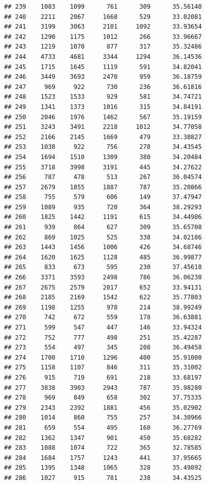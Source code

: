\documentclass[
]{article}
\begin{document}
\begin{verbatim}
## 239    1083    1099      761      309      35.56140
## 240    2211    2067     1668      529      33.02081
## 241    3199    3063     2101     1092      33.93654
## 242    1290    1175     1012      266      33.96667
## 243    1219    1070      877      317      35.32486
## 244    4733    4681     3344     1294      36.14536
## 245    1715    1645     1119      591      34.82041
## 246    3449    3693     2470      959      36.18759
## 247     969     922      730      236      36.61816
## 248    1523    1533      929      581      34.74721
## 249    1341    1373     1016      315      34.84191
## 250    2046    1976     1462      567      35.19159
## 251    3243    3491     2218     1012      34.77058
## 252    2166    2145     1669      479      33.38827
## 253    1038     922      756      278      34.43545
## 254    1694    1510     1309      380      34.20484
## 255    3718    3998     3191      445      34.27622
## 256     787     478      513      267      36.04574
## 257    2679    1855     1887      787      35.20866
## 258     755     579      606      149      37.47947
## 259    1089     935      720      364      38.29293
## 260    1825    1442     1191      615      34.44986
## 261     939     864      627      309      35.65708
## 262     869    1025      525      338      34.02186
## 263    1443    1456     1006      426      34.68746
## 264    1620    1625     1128      485      36.99877
## 265     833     673      595      230      37.45618
## 266    3371    3593     2498      786      36.06230
## 267    2675    2579     2017      652      33.94131
## 268    2185    2169     1542      622      35.77803
## 269    1198    1255      978      214      38.99249
## 270     742     672      559      178      36.63881
## 271     599     547      447      146      33.94324
## 272     752     777      498      251      35.42287
## 273     554     497      345      208      36.49458
## 274    1700    1710     1296      400      35.91000
## 275    1158    1107      846      311      35.31002
## 276     915     719      691      218      33.68197
## 277    3838    3903     2943      787      35.98280
## 278     969     849      658      302      37.75335
## 279    2343    2392     1881      456      35.02902
## 280    1014     860      755      257      34.30966
## 281     659     554      495      160      36.27769
## 282    1362    1347      901      450      35.68282
## 283    1088    1074      722      365      32.78585
## 284    1684    1757     1243      441      37.95665
## 285    1395    1348     1065      328      35.49892
## 286    1027     915      781      238      34.43525

\end{verbatim}
\end{document}
